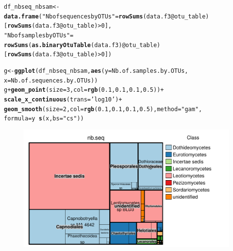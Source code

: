 \documentclass[12pt]{article}\usepackage[]{graphicx}\usepackage[]{color}
\makeatletter
\def\maxwidth{ %
  \ifdim\Gin@nat@width>\linewidth
    \linewidth
  \else
    \Gin@nat@width
  \fi
}
\newcommand{\hlnum}[1]{\textcolor[rgb]{0.686,0.059,0.569}{#1}}%
\newcommand{\hlstr}[1]{\textcolor[rgb]{0.192,0.494,0.8}{#1}}%
\newcommand{\hlopt}[1]{\textcolor[rgb]{0,0,0}{#1}}%
\newcommand{\hlstd}[1]{\textcolor[rgb]{0.345,0.345,0.345}{#1}}%
\newcommand{\hlkwb}[1]{\textcolor[rgb]{0.69,0.353,0.396}{#1}}%
\newcommand{\hlkwc}[1]{\textcolor[rgb]{0.333,0.667,0.333}{#1}}%
\newcommand{\hlkwd}[1]{\textcolor[rgb]{0.737,0.353,0.396}{\textbf{#1}}}%
\newenvironment{kframe}{%
 \def\at@end@of@kframe{}%
 \ifinner\ifhmode%
  \def\at@end@of@kframe{\end{minipage}}%
  \begin{minipage}{\columnwidth}%
 \fi\fi%
 \def\FrameCommand##1{\hskip\@totalleftmargin \hskip-\fboxsep
 \colorbox{shadecolor}{##1}\hskip-\fboxsep
     \hskip-\linewidth \hskip-\@totalleftmargin \hskip\columnwidth}%
 \MakeFramed {\advance\hsize-\width
   \@totalleftmargin\z@ \linewidth\hsize
   \@setminipage}}%
 {\par\unskip\endMakeFramed%
 \at@end@of@kframe}
\newenvironment{knitrout}{}{} %
\numberwithin{figure}{section}
\makeatother
\begin{document}
\begin{knitrout}\small
{}\color{fgcolor}\begin{kframe}
\begin{alltt}
\hlstd{df_nbseq_nbsam} \hlkwb{<-} \hlkwd{data.frame}\hlstd{(}\hlstr{"Nb of sequences by OTUs"} \hlstd{=} \hlkwd{rowSums}\hlstd{(data.f3}\hlopt{@}\hlkwc{otu_table}\hlstd{)}
                             \hlstd{[}\hlkwd{rowSums}\hlstd{(data.f3}\hlopt{@}\hlkwc{otu_table}\hlstd{)} \hlopt{>} \hlnum{0}\hlstd{],}
                             \hlstr{"Nb of samples by OTUs"} \hlstd{=}
                               \hlkwd{rowSums}\hlstd{(}\hlkwd{as.binaryOtuTable}\hlstd{(data.f3)}\hlopt{@}\hlkwc{otu_table}\hlstd{)}
                             \hlstd{[}\hlkwd{rowSums}\hlstd{(data.f3}\hlopt{@}\hlkwc{otu_table}\hlstd{)} \hlopt{>} \hlnum{0}\hlstd{])}

\hlstd{g} \hlkwb{<-} \hlkwd{ggplot}\hlstd{(df_nbseq_nbsam,} \hlkwd{aes}\hlstd{(}\hlkwc{y} \hlstd{= Nb.of.samples.by.OTUs,}
                                \hlkwc{x} \hlstd{= Nb.of.sequences.by.OTUs))}
\hlstd{g} \hlopt{+} \hlkwd{geom_point}\hlstd{(}\hlkwc{size} \hlstd{=} \hlnum{3}\hlstd{,} \hlkwc{col} \hlstd{=} \hlkwd{rgb}\hlstd{(}\hlnum{0.1}\hlstd{,} \hlnum{0.1}\hlstd{,} \hlnum{0.1}\hlstd{,} \hlnum{0.5}\hlstd{))} \hlopt{+}
  \hlkwd{scale_x_continuous}\hlstd{(}\hlkwc{trans} \hlstd{=} \hlstr{'log10'}\hlstd{)} \hlopt{+}
  \hlkwd{geom_smooth}\hlstd{(}\hlkwc{size} \hlstd{=} \hlnum{2}\hlstd{,} \hlkwc{col} \hlstd{=} \hlkwd{rgb}\hlstd{(}\hlnum{0.1}\hlstd{,} \hlnum{0.1}\hlstd{,} \hlnum{0.1}\hlstd{,} \hlnum{0.5}\hlstd{),} \hlkwc{method} \hlstd{=} \hlstr{"gam"}\hlstd{,}
              \hlkwc{formula}  \hlstd{= y} \hlopt{~} \hlkwd{s}\hlstd{(x,} \hlkwc{bs} \hlstd{=} \hlstr{"cs"}\hlstd{))}
\end{alltt}
\end{kframe}\begin{figure}

{\centering \includegraphics[width=\maxwidth]{figure/unnamed-chunk-22-1} 

}
\end{figure}
\end{knitrout}
\end{document}
